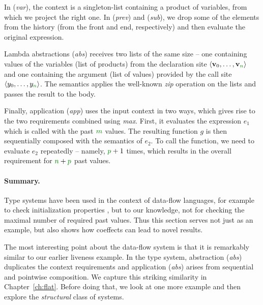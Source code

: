 In (\emph{var}), the context is a singleton-list containing a product of variables, from which
we project the right one. In (\emph{prev}) and (\emph{sub}), we drop some of the elements from
the history (from the front and end, respectively) and then evaluate the original expression.

Lambda abstractions (\emph{abs}) receives two lists of the same size -- one containing values of
the variables (list of products) from the declaration site $\langle \mathbf{v}_0, \ldots, \mathbf{v}_{\cclrd{n}} \rangle$
and one containing the argument (list of values) provided by the call site $\langle y_0, \ldots, y_{\cclrd{n}} \rangle$.
The semantics applies the well-known \emph{zip} operation on the lists and passes the result to the
body.

Finally, application (\emph{app}) uses the input context in two ways, which gives rise to the
two requirements combined using \emph{max}. First, it evaluates the expression $e_1$ which is
called with the past $\cclrd{m}$ values. The resulting function $g$ is then sequentially composed
with the semantics of $e_2$. To call the function, we need to evaluate $e_2$ repeatedly -- namely,
$\cclrd{p}+1$ times, which results in the overall requirement for $\cclrd{n}+\cclrd{p}$ past values.

\paragraph{Summary.}
Type systems have been used in the context of data-flow languages, for example to check
initialization properties \cite{app-dataflow-init}, but to our knowledge, not for checking
the maximal number of required past values. Thus this section serves not just as an example,
but also shows how coeffects can lead to novel results.

The most interesting point about the data-flow system is that it is remarkably similar to our
earlier liveness example. In the type system, abstraction (\emph{abs}) duplicates the context
requirements and application (\emph{abs}) arises from sequential and pointwise composition.
We capture this striking similarity in Chapter~\ref{ch:flat}. Before doing that, we look at one
more example and then explore the \emph{structural} class of systems.


